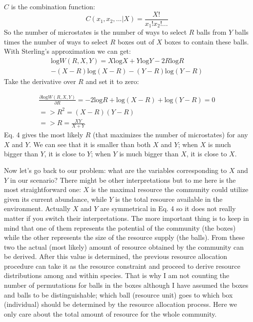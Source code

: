 \documentclass[12pt]{article}
\begin{document}
$C$ is the combination function:
\begin{equation}
C(x_1,x_2,... |X) = \frac{X!}{x_1! x_2! ...}
\end{equation}
So the number of microstates is the number of ways to select $R$ balls from $Y$ balls times the number of ways to select $R$ boxes out of $X$ boxes to contain these balls. With Sterling's approximation we can get:
  \begin{equation}
 \begin{split}
\mbox{log} W(R,X,Y) = X \mbox{log} X + Y \mbox{log} Y - 2 R \mbox{log} R \\
 - (X-R) \mbox{log} (X-R) - (Y-R) \mbox{log} (Y-R)
\end{split}
\end{equation}
Take the derivative over $R$ and set it to zero:

  \begin{equation}
 \begin{split}
\frac{\partial \mbox{log} W(R,X,Y)}{\partial R} =  - 2 \mbox{log} R + \mbox{log} (X-R) + \mbox{log} (Y-R) = 0\\
=> R^2 = (X-R)(Y-R)\\
=> R = \frac{XY}{X+Y}
\end{split}
\end{equation}
Eq. 4 gives the most likely $R$ (that maximizes the number of microstates) for any $X$ and $Y$. We can see that it is smaller than both $X$ and $Y$; when $X$ is much bigger than $Y$, it is close to $Y$; when $Y$ is much bigger than $X$, it is close to $X$.

Now let's go back to our problem: what are the variables corresponding to $X$ and $Y$ in our scenario? There might be other interpretations but to me here is the most straightforward one: $X$ is the maximal resource the community could utilize given its current abundance, while $Y$ is the total resource available in the environment. Actually $X$ and $Y$ are symmetrical in Eq. 4 so it does not really matter if you switch their interpretations. The more important thing is to keep in mind that one of them represents  the potential of the community (the boxes) while the other represents the size of the resource supply (the balls). From these two the actual (most likely) amount of resource obtained by the community can be derived. After this value is determined, the previous resource allocation procedure can take it as the resource constraint and proceed to derive resource distributions among and within species. That is why I am not counting the number of permutations for balls in the boxes although I have assumed the boxes and balls to be distinguishable; which ball (resource unit) goes to which box (individual) should be determined by the resource allocation process. Here we only care about the total amount of resource for the whole community. 
\end{document}
